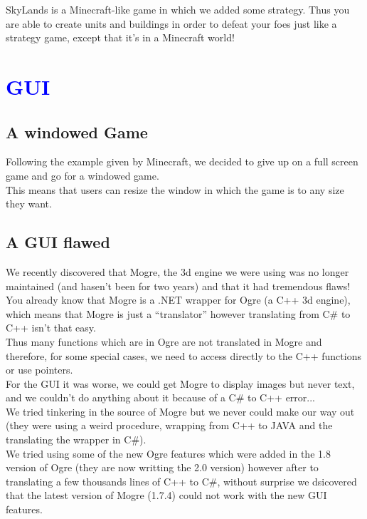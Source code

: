 \documentclass[article]{report}         %
\begin{document}
      SkyLands is a Minecraft-like game in which we added some strategy. Thus you are able to create units and buildings in order to defeat your foes just like a strategy game, except that it's in a Minecraft world!\\



		\chapter{\textcolor{blue}{GUI}}
      \section{A windowed Game}
        Following the example given by Minecraft, we decided to give up on a full screen game and go for a windowed game.\\
        This means that users can resize the window in which the game is to any size they want.\\
      \section{A GUI flawed}
        We recently discovered that Mogre, the 3d engine we were using was no longer maintained (and hasen't been for two years) and that it had tremendous flaws!\\
        You already know that Mogre is a .NET wrapper for Ogre (a C++ 3d engine), which means that Mogre is just a ``translator'' however translating from C\# to C++ isn't that easy.\\
        Thus many functions which are in Ogre are not translated in Mogre and therefore, for some special cases, we need to access directly to the C++ functions or use pointers.\\

        For the GUI it was worse, we could get Mogre to display images but never text, and we couldn't do anything about it because of a C\# to C++ error...\\
        We tried tinkering in the source of Mogre but we never could make our way out (they were using a weird procedure, wrapping from C++ to JAVA and the translating the wrapper in C\#).\\
        We tried using some of the new Ogre features which were added in the 1.8 version of Ogre (they are now writting the 2.0 version) however after to translating a few thousands lines of C++ to C\#, without surprise we dsicovered that the latest version of Mogre (1.7.4) could not work with the new GUI features.\\
\end{document}

